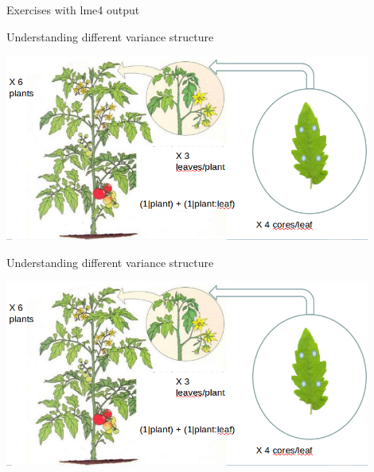 \documentclass{beamer}
\begin{document}
\begin{frame}{Exercises with lme4 output}
 
\end{frame}


\begin{frame}{Understanding different variance structure}
 
 \begin{center}
  \includegraphics[width=0.9\textwidth]{Figures/nestedtomatoes}
 \end{center}

\end{frame}

\begin{frame}{Understanding different variance structure}
 
 \begin{center}
  \includegraphics[width=0.9\textwidth]{Figures/nestedtomatoes}
 \end{center}

\end{frame}
\end{document}
